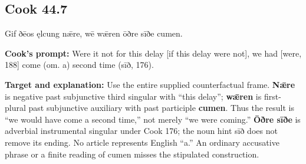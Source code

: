 \par\begin{minipage}{\linewidth}\raggedright
\subsection*{Cook 44.7}

Gif ðēos ęlcung nǣre, wē wǣren ōðre sīðe cumen.

\textbf{Cook’s prompt:} Were it not for this delay [if this delay were not], we had [were, 188] come (om. a) second time (sīð, 176).

\textbf{Target and explanation:} Use the entire supplied counterfactual frame. \textbf{Nǣre} is negative past subjunctive third singular with “this delay”; \textbf{wǣren} is first-plural past subjunctive auxiliary with past participle \textbf{cumen}. Thus the result is “we would have come a second time,” not merely “we were coming.” \textbf{Ōðre sīðe} is adverbial instrumental singular under Cook 176; the noun hint sīð does not remove its ending. No article represents English “a.” An ordinary accusative phrase or a finite reading of cumen misses the stipulated construction.

\end{minipage}\par\addvspace{4pt}

